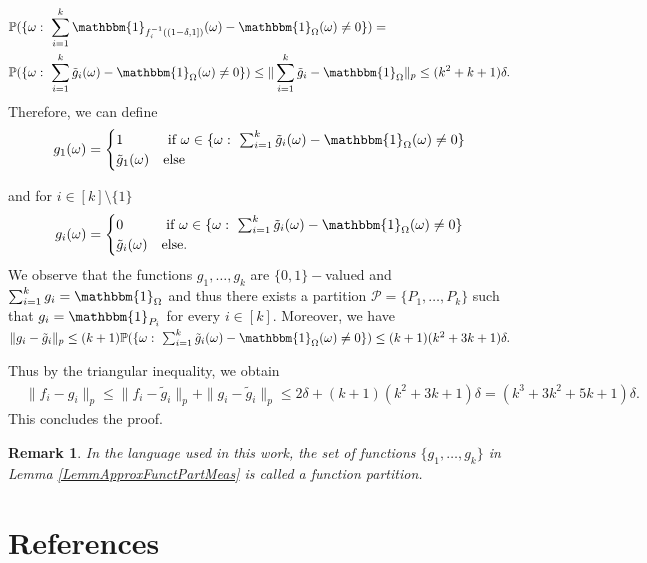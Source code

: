\documentclass[11pt]{article}
\newtheorem{remark}[theorem]{Remark}
\def\P{\mathbb{P}}
\newcommand{\cP}{{\mathcal P}}  %
\renewcommand{\P}{\mathbb{P}}
\begin{document}
$$\begin{aligned}
   & \P(\{\omega:\ \sum^k_{i=1}\mathbbm{1}_{f_i^{-1}((1-\delta,1])}(\omega)-\mathbbm{1}_{\Omega}(\omega)\neq 0 \})=\\
   &\P(\{\omega:\ \sum^k_{i=1}\tilde{g}_i(\omega)-\mathbbm{1}_{\Omega}(\omega)\neq 0 \})\leq \|\sum^k_{i=1}\tilde{g}_i-\mathbbm{1}_{\Omega}\|_p\leq (k^2+k+1)\delta.
\end{aligned}
$$
Therefore, we can define $$
g_1(\omega)=\begin{cases}
    1 &  \text{ if } \omega\in\{\omega:\ \sum^k_{i=1}\tilde{g}_i(\omega)-\mathbbm{1}_{\Omega}(\omega)\neq 0 \}\\
    \tilde{g}_1(\omega) & \text{else}
\end{cases}
$$

and for $i\in [k]\setminus \{1\}$
$$
g_i(\omega)=\begin{cases}
    0&  \text{ if } \omega\in\{\omega:\ \sum^k_{i=1}\tilde{g}_i(\omega)-\mathbbm{1}_{\Omega}(\omega)\neq 0 \}\\
    \tilde{g}_i(\omega) & \text{else}.
\end{cases}
$$
We observe that the functions $g_1,\ldots,g_k$ are $\{0,1\}-$valued and $\sum^k_{i=1}g_i=\mathbbm{1}_{\Omega}$ and thus there exists a partition $\cP=\{P_1,\ldots, P_k\}$ such that $g_i=\mathbbm{1}_{P_i}$ for every $i\in [k]. $ Moreover, we have $\|g_i-\tilde{g}_i\|_p\leq (k+1)\P(\{\omega:\ \sum^k_{i=1}\tilde{g}_i(\omega)-\mathbbm{1}_{\Omega}(\omega)\neq 0 \})\leq (k+1)(k^2+3k+1)\delta.$ 

Thus by the triangular inequality, we obtain
$$\begin{aligned}
   & \|f_i-g_i\|_p\leq \|f_i-\tilde{g}_i\|_p+\|g_i-\tilde{g}_i\|_p\leq 2\delta+(k+1)(k^2+3k+1)\delta=(k^3+3k^2+5k+1)\delta.
   \end{aligned}$$
This concludes the proof.
\endproof
\begin{remark}
In the language used in this work, the set of functions $\{g_1,\ldots,g_k\}$ in Lemma \ref{LemmApproxFunctPartMeas} is called a function partition.
\end{remark}
\section*{References}

 

\end{document}
